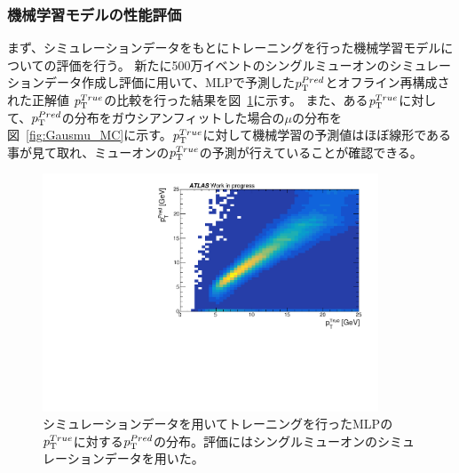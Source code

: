 


\newpage
\subsubsection{機械学習モデルの性能評価}
まず、シミュレーションデータをもとにトレーニングを行った機械学習モデルについての評価を行う。
新たに500万イベントのシングルミューオンのシミュレーションデータ作成し評価に用いて、MLPで予測した$p_{\rm{T}}^{Pred}$とオフライン再構成された正解値 $p_{\rm{T}}^{True}$の比較を行った結果を図~\ref{fig:zannsa_25_MC}に示す。
また、ある$p_{\rm{T}}^{True}$に対して、$p_{\rm{T}}^{Pred}$の分布をガウシアンフィットした場合の$\mu$の分布を図~\ref{fig:Gausmu_MC}に示す。$p_{\rm{T}}^{True}$に対して機械学習の予測値はほぼ線形である事が見て取れ、ミューオンの$p_{\rm{T}}^{True}$の予測が行えていることが確認できる。

\begin{figure}[tb]
  \centering
  \includegraphics[clip, width=10cm]{fig/4/MC_pred_true_25.pdf}
  \caption{シミュレーションデータを用いてトレーニングを行ったMLPの$p_{\rm{T}}^{True}$に対する$p_{\rm{T}}^{Pred}$の分布。評価にはシングルミューオンのシミュレーションデータを用いた。}
  \label{fig:zannsa_25_MC}
\end{figure}

